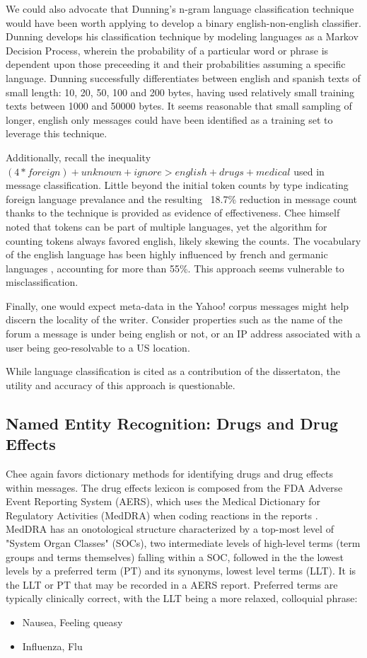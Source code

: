 \documentclass[twoside,11pt]{article}
\begin{document}
We could also advocate that Dunning's n-gram language classification technique would have been worth applying to develop a binary english-non-english classifier. Dunning develops his classification technique by modeling languages as a Markov Decision Process, wherein the probability of a particular word or phrase is dependent upon those preceeding it and their probabilities assuming a specific language. Dunning successfully differentiates between english and spanish texts of small length: 10, 20, 50, 100 and 200 bytes, having used relatively small training texts between 1000 and 50000 bytes. It seems reasonable that small sampling of longer, english only messages could have been identified as a training set to leverage this technique.

Additionally, recall the inequality $(4 * foreign) + unknown + ignore > english + drugs + medical$ used in message classification. Little beyond the initial token counts by type indicating foreign language prevalance and the resulting ~18.7\% reduction in message count thanks to the technique is provided as evidence of effectiveness. Chee himself noted that tokens can be part of multiple languages, yet the algorithm for counting tokens always favored english, likely skewing the counts. The vocabulary of the english language has been highly influenced by french and germanic languages \citep{Wikipedia page for english}, accounting for more than 55\%. This approach seems vulnerable to misclassification.

Finally, one would expect meta-data in the Yahoo! corpus messages might help discern the locality of the writer. Consider properties such as the name of the forum a message is under being english or not, or an IP address associated with a user being geo-resolvable to a US location.

While language classification is cited as a contribution of the dissertaton, the utility and accuracy of this approach is questionable.


\subsection{Named Entity Recognition: Drugs and Drug Effects}
Chee again favors dictionary methods for identifying drugs and drug effects within messages. The drug effects lexicon is composed from the FDA Adverse Event Reporting System (AERS), which uses the Medical Dictionary for Regulatory Activities (MedDRA) when coding reactions in the reports \citep{FAERS}. MedDRA has an onotological structure characterized by a top-most level of "System Organ Classes" (SOCs), two intermediate levels of high-level terms (term groups and terms themselves) falling within a SOC, followed in the the lowest levels by a preferred term (PT) and its synonyms, lowest level terms (LLT). It is the LLT or PT that may be recorded in a AERS report. Preferred terms are typically clinically correct, with the LLT being a more relaxed, colloquial phrase:
\begin{itemize}
  \item Nausea,  Feeling queasy
  \item Influenza,  Flu
\end{itemize}
\end{document}
